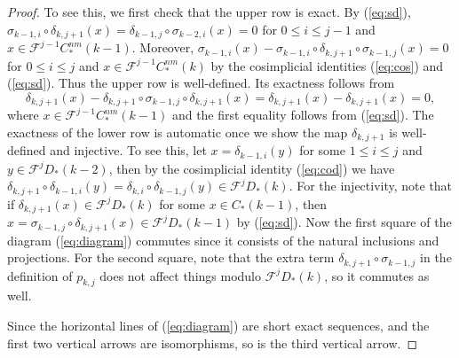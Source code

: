 \documentclass[10pt,a4paper]{amsart}
\begin{document}
\begin{proof}
To see this, we first check that the upper row is exact. By (\ref{eq:sd}), $\sigma_{k-1,i}\circ\delta_{k,j+1}(x)=\delta_{k-1,j}\circ\sigma_{k-2,i}(x)=0$ for $0\leq i\leq j-1$ and $x\in\mathscr{F}^{j-1}C_\ast^\mathit{nm}(k-1)$. Moreover, $\sigma_{k-1,i}(x)-\sigma_{k-1,i}\circ\delta_{k,j+1}\circ\sigma_{k-1,j}(x)=0$ for $0\leq i\leq j$ and $x\in\mathscr{F}^{j-1}C_\ast^\mathit{nm}(k)$ by the cosimplicial identities (\ref{eq:cos}) and (\ref{eq:sd}). Thus the upper row is well-defined. Its exactness follows from
\begin{equation}
\delta_{k,j+1}(x)-\delta_{k,j+1}\circ\sigma_{k-1,j}\circ\delta_{k,j+1}(x)=\delta_{k,j+1}(x)-\delta_{k,j+1}(x)=0,
\end{equation}
where $x\in\mathscr{F}^{j-1}C_\ast^\mathit{nm}(k-1)$ and the first equality follows from (\ref{eq:sd}). The exactness of the lower row is automatic once we show the map $\delta_{k,j+1}$ is well-defined and injective. To see this, let $x=\delta_{k-1,i}(y)$ for some $1\leq i\leq j$ and $y\in\mathscr{F}^{j}D_\ast(k-2)$, then by the cosimplicial identity (\ref{eq:cod}) we have $\delta_{k,j+1}\circ\delta_{k-1,i}(y)=\delta_{k,i}\circ\delta_{k-1,j}(y)\in\mathscr{F}^jD_\ast(k)$. For the injectivity, note that if $\delta_{k,j+1}(x)\in\mathscr{F}^jD_\ast(k)$ for some $x\in C_\ast(k-1)$, then $x=\sigma_{k-1,j}\circ\delta_{k,j+1}(x)\in\mathscr{F}^{j}D_\ast(k-1)$ by (\ref{eq:sd}). Now the first square of the diagram (\ref{eq:diagram}) commutes since it consists of the natural inclusions and projections. For the second square, note that the extra term $\delta_{k,j+1}\circ\sigma_{k-1,j}$ in the definition of $p_{k,j}$ does not affect things modulo $\mathscr{F}^jD_\ast(k)$, so it commutes as well.

Since the horizontal lines of (\ref{eq:diagram}) are short exact sequences, and the first two vertical arrows are isomorphisms, so is the third vertical arrow.
\end{proof}
\end{document}
